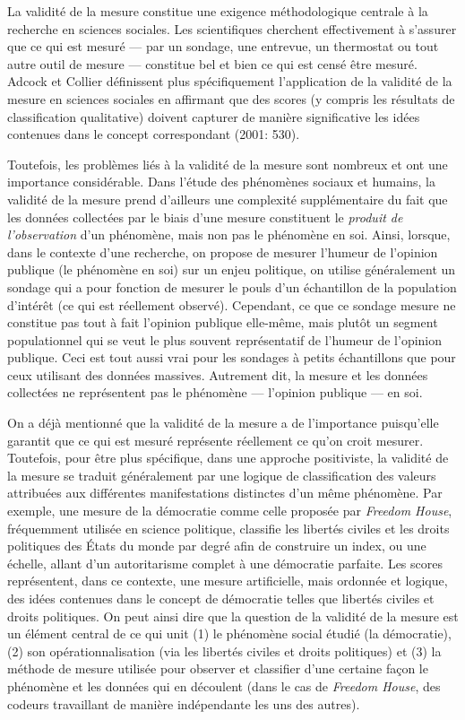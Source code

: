 \documentclass[
  letterpaper,
]{scrbook}
\begin{document}
La validité de la mesure constitue une exigence méthodologique centrale
à la recherche en sciences sociales. Les scientifiques cherchent
effectivement à s'assurer que ce qui est mesuré --- par un sondage, une
entrevue, un thermostat ou tout autre outil de mesure --- constitue bel
et bien ce qui est censé être mesuré. Adcock et Collier définissent plus
spécifiquement l'application de la validité de la mesure en sciences
sociales en affirmant que des scores (y compris les résultats de
classification qualitative) doivent capturer de manière significative
les idées contenues dans le concept correspondant (2001: 530).

Toutefois, les problèmes liés à la validité de la mesure sont nombreux
et ont une importance considérable. Dans l'étude des phénomènes sociaux
et humains, la validité de la mesure prend d'ailleurs une complexité
supplémentaire du fait que les données collectées par le biais d'une
mesure constituent le \emph{produit de l'observation} d'un phénomène,
mais non pas le phénomène en soi. Ainsi, lorsque, dans le contexte d'une
recherche, on propose de mesurer l'humeur de l'opinion publique (le
phénomène en soi) sur un enjeu politique, on utilise généralement un
sondage qui a pour fonction de mesurer le pouls d'un échantillon de la
population d'intérêt (ce qui est réellement observé). Cependant, ce que
ce sondage mesure ne constitue pas tout à fait l'opinion publique
elle-même, mais plutôt un segment populationnel qui se veut le plus
souvent représentatif de l'humeur de l'opinion publique. Ceci est tout
aussi vrai pour les sondages à petits échantillons que pour ceux
utilisant des données massives. Autrement dit, la mesure et les données
collectées ne représentent pas le phénomène --- l'opinion publique ---
en soi.

On a déjà mentionné que la validité de la mesure a de l'importance
puisqu'elle garantit que ce qui est mesuré représente réellement ce
qu'on croit mesurer. Toutefois, pour être plus spécifique, dans une
approche positiviste, la validité de la mesure se traduit généralement
par une logique de classification des valeurs attribuées aux différentes
manifestations distinctes d'un même phénomène. Par exemple, une mesure
de la démocratie comme celle proposée par \emph{Freedom House},
fréquemment utilisée en science politique, classifie les libertés
civiles et les droits politiques des États du monde par degré afin de
construire un index, ou une échelle, allant d'un autoritarisme complet à
une démocratie parfaite. Les scores représentent, dans ce contexte, une
mesure artificielle, mais ordonnée et logique, des idées contenues dans
le concept de démocratie telles que libertés civiles et droits
politiques. On peut ainsi dire que la question de la validité de la
mesure est un élément central de ce qui unit (1) le phénomène social
étudié (la démocratie), (2) son opérationnalisation (via les libertés
civiles et droits politiques) et (3) la méthode de mesure utilisée pour
observer et classifier d'une certaine façon le phénomène et les données
qui en découlent (dans le cas de \emph{Freedom House}, des codeurs
travaillant de manière indépendante les uns des autres).
\end{document}

